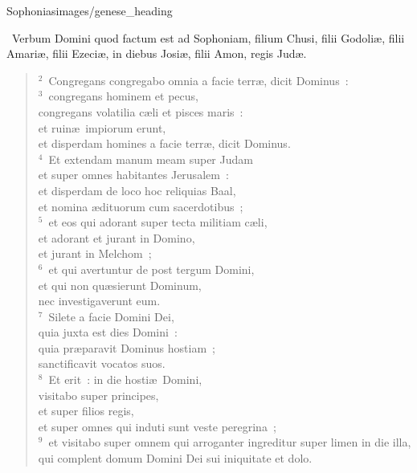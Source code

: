 {Sophonias}{images/genese_heading}

~\lettrine[lines=10,image=true,loversize=0.05,lraise=-0.03]{V}{}erbum Domini quod factum est ad Sophoniam, filium Chusi, filii Godoli\ae , filii Amari\ae , filii Ezeci\ae , in diebus Josi\ae , filii Amon, regis Jud\ae .


\begin{flushleft}\begin{verse}\vspace{6pt}${}^{2}$~Congregans congregabo omnia a facie terr\ae , dicit Dominus~:\\
${}^{3}$~congregans hominem et pecus,\\ congregans volatilia c\ae li et pisces maris~:\\ et ruin\ae\ impiorum erunt,\\ et disperdam homines a facie terr\ae , dicit Dominus.\\
${}^{4}$~Et extendam manum meam super Judam\\ et super omnes habitantes Jerusalem~:\\ et disperdam de loco hoc reliquias Baal,\\ et nomina \ae dituorum cum sacerdotibus~;\\
${}^{5}$~et eos qui adorant super tecta militiam c\ae li,\\ et adorant et jurant in Domino,\\ et jurant in Melchom~;\\
${}^{6}$~et qui avertuntur de post tergum Domini,\\ et qui non qu\ae sierunt Dominum,\\ nec investigaverunt eum.\\
${}^{7}$~Silete a facie Domini Dei,\\ quia juxta est dies Domini~:\\ quia pr\ae paravit Dominus hostiam~;\\ sanctificavit vocatos suos.\\
${}^{8}$~Et erit~: in die hosti\ae\ Domini,\\ visitabo super principes,\\ et super filios regis,\\ et super omnes qui induti sunt veste peregrina~;\\
${}^{9}$~et visitabo super omnem qui arroganter ingreditur super limen in die illa,\\ qui complent domum Domini Dei sui iniquitate et dolo.\\

\end{verse}
\end{flushleft}
